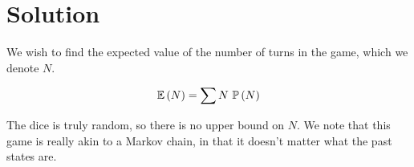 \documentclass[11pt]{article}
\begin{document}
\section{Solution}
We wish to find the expected value of the number of turns in the game, which we denote $N$.

\[
    \mathbb E \left ( N \right) = \sum N\ \mathbb P \left ( N \right)
\]

The dice is truly random, so there is no upper bound on $N$.
We note that this game is really akin to a Markov chain, in that it doesn't matter what the past states are.
\end{document}

